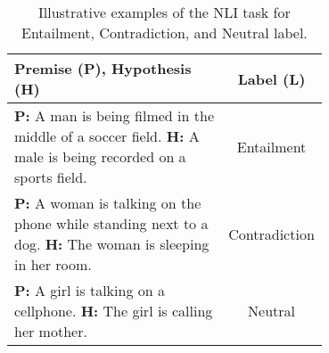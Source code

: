 \begin{table}[t]
    \centering
    \small
    \begin{tabular}{@{}p{0.7\linewidth}c@{}}
        \toprule
        \textbf{Premise (P), Hypothesis (H)} & \textbf{Label (L)}\\
        \midrule
        \textbf{P:} A man is being filmed in the middle of a soccer field. \newline
        \textbf{H:} A male is being recorded on a sports field. & Entailment\\ 
        \textbf{P:} A woman is talking on the phone while standing next to a dog. \newline
        \textbf{H:} The woman is sleeping in her room. & Contradiction\\
        \textbf{P:} A girl is talking on a cellphone. \newline
        \textbf{H:} The girl is calling her mother. & Neutral \\
        \bottomrule 
    \end{tabular}
    \caption{Illustrative examples of the NLI task for Entailment, Contradiction, and Neutral label.}
    \label{tab:nli_examples}
\end{table}